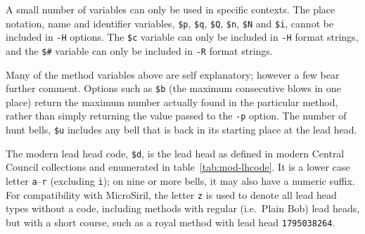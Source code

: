 \documentclass[a4paper,11pt,oneside]{book}
\makeatletter
\newcommand{\fspec}[1]{\index{#1@{\hspace*{-\fspecwidth}\texttt{\$#1}}}}
\makeatother
\begin{document}
A small number of variables can only be used in specific 
contexts.  The place notation, name and identifier variables, 
\verb+$p+, \verb+$q+, \verb+$Q+, \verb+$n+, \verb+$N+ and \verb+$i+,
cannot be included in \verb+-H+ options.
The \verb+$c+ variable can only be included in \verb+-H+ format strings, 
and the \verb+$#+ variable can only be included in \verb+-R+ format strings.

Many of the method variables above are self explanatory; however a few
bear further comment.  Options such as \verb+$b+\fspec{b} (the maximum
consecutive blows in one place) return the maximum number actually found
in the particular method, rather than simply returning the value passed
to the \verb+-p+ option.  The number of hunt bells, \verb+$u+\fspec{u} 
includes any bell that is back in its starting place at the lead head.

The modern lead head code, \verb+$d+\fspec{d}, is the lead head as defined
in modern Central Council collections and enumerated in 
table~\ref{tab:mod-lhcode}.
It is a lower case letter \verb+a+--\verb+r+ (excluding \verb+i+); 
on nine or more bells, it may also have a numeric suffix.  For compatibility
with MicroSiril, the letter \verb+z+ is used
to denote all lead head types without a code, including methods with regular
(i.e.\ Plain Bob) lead heads, but with a short course, such as a royal
method with lead head \verb+1795038264+.
\end{document}
